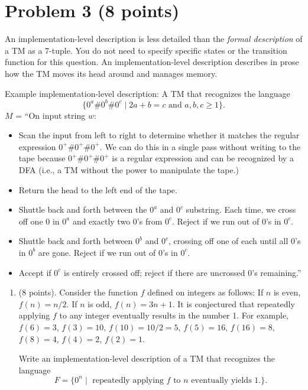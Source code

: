 \documentclass[letterpaper,11pt,twoside]{article}
\theoremstyle{plain}
\theoremstyle{definition}
\theoremstyle{remark}
\theoremstyle{restate}
\begin{document}
\clearpage
\section{Problem 3 (8 points)}
    An implementation-level description is less detailed than the \emph{formal description} of a TM as a 7-tuple. You do not need to specify specific states or the transition function for this question. An implementation-level description describes in prose how the TM moves its head around and manages memory.

    Example implementation-level description: A TM that recognizes the language 
    \[
        \{0^a\#0^b\#0^{c} \; | \; 2a + b = c \text{ and } a, b, c \geq 1\}.
    \]
    $M$ = ``On input string $w$:
    \begin{itemize}
        \item Scan the input from left to right to determine whether it matches the regular expression $0^+\#0^+\#0^+$. We can do this in a single pass without writing to the tape because $0^+\#0^+\#0^+$ is a regular expression and can be recognized by a DFA (i.e., a TM without the power to manipulate the tape.)
        \item Return the head to the left end of the tape.
        \item Shuttle back and forth between the $0^a$ and $0^c$ substring. Each time, we cross off one $0$ in $0^a$ and exactly two $0$'s from $0^c$. Reject if we run out of $0$'s in $0^c$.
        \item Shuttle back and forth between $0^b$ and $0^c$, crossing off one of each until all $0$'s in $0^b$ are gone. Reject if we run out of $0$'s in $0^c$.
        \item Accept if $0^c$ is entirely crossed off; reject if there are uncrossed $0$'s remaining.''
    \end{itemize}

    \begin{enumerate}
        \item (8 points). Consider the function $f$ defined on integers as follows: If $n$ is even, $f(n) = n/2$. If $n$ is odd, $f(n) = 3n+1$. It is conjectured that repeatedly applying $f$ to any integer eventually results in the number 1. For example, $f(6) = 3$, $f(3) = 10$, $f(10) = 10/2 = 5$, $f(5) = 16$, $f(16) = 8$, $f(8) = 4$, $f(4) = 2$, $f(2) = 1$.
        
        Write an implementation-level description of a TM that recognizes the language
        \[
            F = \{0^n \; | \; \text{ repeatedly applying $f$ to $n$ eventually yields $1$.}\}.
        \]
    \end{enumerate}
    
\end{document}
